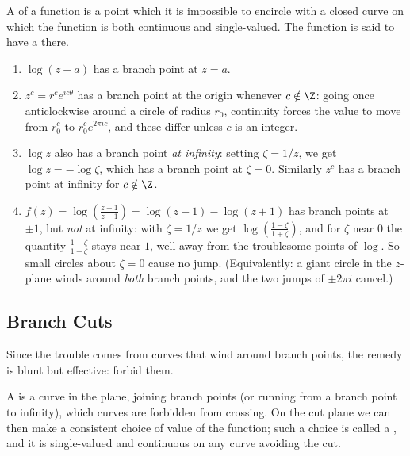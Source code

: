 \begin{definition}
	A  of a function is a point which it is impossible to encircle with a closed curve on which the function is both continuous and single-valued. The function is said to have a  there.
\end{definition}

\begin{example}
	\begin{enumerate}[label=(\roman*)]
		\item $\log(z - a)$ has a branch point at $z = a$.
		\item $z^c = r^c e^{ic\theta}$ has a branch point at the origin whenever $c \notin \Z$: going once anticlockwise around a circle of radius $r_0$, continuity forces the value to move from $r_0^c$ to $r_0^c e^{2\pi i c}$, and these differ unless $c$ is an integer.
		\item $\log z$ also has a branch point \emph{at infinity}: setting $\zeta = 1/z$, we get $\log z = -\log \zeta$, which has a branch point at $\zeta = 0$. Similarly $z^c$ has a branch point at infinity for $c \notin \Z$.
		\item $\displaystyle f(z) = \log\left(\frac{z - 1}{z + 1}\right) = \log(z-1) - \log(z+1)$ has branch points at $\pm 1$, but \emph{not} at infinity: with $\zeta = 1/z$ we get $\log\left(\frac{1 - \zeta}{1 + \zeta}\right)$, and for $\zeta$ near $0$ the quantity $\frac{1-\zeta}{1+\zeta}$ stays near $1$, well away from the troublesome points of $\log$. So small circles about $\zeta = 0$ cause no jump. (Equivalently: a giant circle in the $z$-plane winds around \emph{both} branch points, and the two jumps of $\pm 2\pi i$ cancel.)
	\end{enumerate}
\end{example}

\subsection{Branch Cuts}

Since the trouble comes from curves that wind around branch points, the remedy is blunt but effective: forbid them.

\begin{definition}
	A  is a curve in the plane, joining branch points (or running from a branch point to infinity), which curves are forbidden from crossing. On the cut plane we can then make a consistent choice of value of the function; such a choice is called a , and it is single-valued and continuous on any curve avoiding the cut.
\end{definition}

